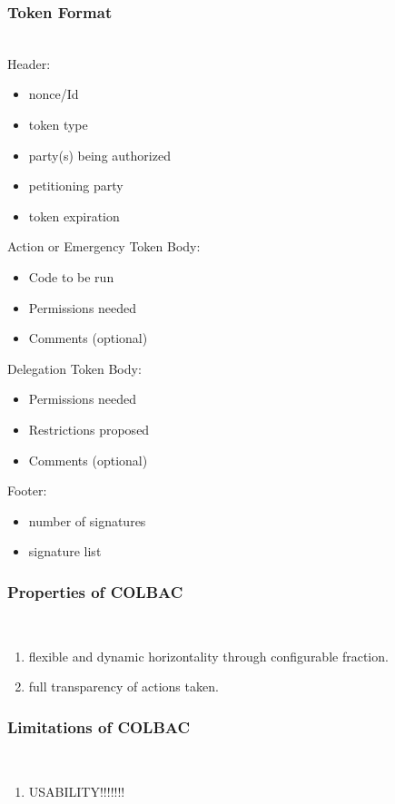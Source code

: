 \subsubsection{Token Format}
\label{sec:tokenformat}
\mbox{}\\
Header:
\begin{itemize}
\item nonce/Id
\item token type
\item party(s) being authorized
\item petitioning party
\item token expiration
\end{itemize}
Action or Emergency Token Body:
\begin{itemize}
\item Code to be run
\item Permissions needed
\item Comments (optional)
\end{itemize}
Delegation Token Body:
\begin{itemize}
\item Permissions needed
\item Restrictions proposed
\item Comments (optional)
\end{itemize}
Footer:
\begin{itemize}
\item number of signatures
\item signature list
\end{itemize}

\subsubsection{Properties of COLBAC}
\mbox{}\\
\begin{enumerate}
\item flexible and dynamic horizontality through configurable fraction.
\item full transparency of actions taken.
\end{enumerate}

\subsubsection{Limitations of COLBAC}
\mbox{}\\
\begin{enumerate}
\item USABILITY!!!!!!!
\end{enumerate}
